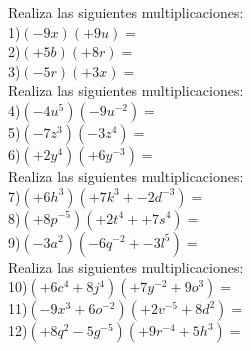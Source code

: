 \documentclass[a4paper,12pt]{article}
\begin{document}
 \pagebreak 
Realiza las siguientes multiplicaciones: \vspace{1cm}\\ 
1)$(-9x)(+9u)=$\vspace{1cm}\\ 
2)$(+5b)(+8r)=$\vspace{1cm}\\ 
3)$(-5r)(+3x)=$\vspace{1cm}\\ 
Realiza las siguientes multiplicaciones: \vspace{1cm}\\ 
4)$(-4u^{5})(-9u^{-2} )=$\vspace{1cm}\\ 
5)$(-7z^{3})(-3z^{4} )=$\vspace{1cm}\\ 
6)$(+2y^{4})(+6y^{-3} )=$\vspace{1cm}\\ 
Realiza las siguientes multiplicaciones: \vspace{1cm}\\ 
7)$(+6h^{3})(+7k^{3}+-2d^{-3} )=$\vspace{1cm}\\ 
8)$(+8p^{-5})(+2t^{4}++7s^{4} )=$\vspace{1cm}\\ 
9)$(-3a^{2})(-6q^{-2}+-3l^{5} )=$\vspace{1cm}\\ 
Realiza las siguientes multiplicaciones: \vspace{1cm}\\ 
10)$(+6c^{4}+8j^{4} )(+7y^{-2}+9o^{3} )=$\vspace{1cm}\\ 
11)$(-9x^{3}+6o^{-2} )(+2v^{-5}+8d^{2} )=$\vspace{1cm}\\ 
12)$(+8q^{2}-5g^{-5} )(+9r^{-4}+5h^{3} )=$\vspace{1cm}\\ 
\end{document}
